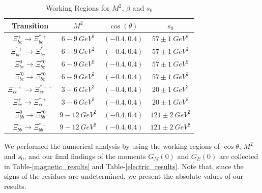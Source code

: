 \begin{table}[ht]
    \centering
    \begin{tabular}{|c|c|c|c|}
        \hline
         Transition & $M^2$ & $\cos(\theta)$ & $s_0$  \\
         \hline
         $\Xi_{bc}^+\rightarrow\Xi_{bc}^{\ast+}$ & $6-9~GeV^2$ & $(-0.4,0.4)$ & $57\pm1 ~GeV^2$\\
         \hline
         $\Xi_{bc}^{\prime+}\rightarrow\Xi_{bc}^{\ast+}$& $6-9~GeV^2$ & $(-0.4,0.4)$ & $57\pm1~ GeV^2$\\
         \hline
         $\Xi_{bc}^0\rightarrow\Xi_{bc}^{\ast0}$& $6-9~GeV^2$ & $(-0.4,0.4)$ & $57\pm1~ GeV^2$\\
         \hline
         $\Xi_{bc}^{\prime0}\rightarrow\Xi_{bc}^{\ast0}$& $6-9 ~GeV^2$ & $(-0.4,0.4)$ & $57\pm1~ GeV^2$\\
         \hline
         $\Xi_{cc}^{++}\rightarrow\Xi_{cc}^{\ast++}$& $3-6 ~GeV^2$ & $(-0.4,0.4)$ & $20\pm1~ GeV^2$\\
         \hline
         $\Xi_{cc}^+\rightarrow\Xi_{cc}^{\ast+}$& $3-6 ~GeV^2$ & $(-0.4,0.4)$ & $20\pm1 ~GeV^2$\\
         \hline
         $\Xi_{bb}^0\rightarrow\Xi_{bb}^{\ast0}$& $9-12 ~GeV^2$ & $(-0.4,0.4)$ & $121\pm2 ~GeV^2$\\
         \hline
         $\Xi_{bb}^-\rightarrow\Xi_{bb}^{\ast-}$& $9-12 ~GeV^2$ & $(-0.4,0.4)$ & $121\pm2 ~GeV^2$\\
        \hline
    \end{tabular}
    \caption{Working Regions for $M^2$, $\beta$ and $s_0$}
    \label{parameter_table}
\end{table}
We performed the numerical analysis by using the working regions of $\cos\theta$, $M^2$ and $s_0$, and our final findings of the moments $G_M(0)$ and $G_E(0)$ are collected in Table-\ref{magnetic_results} and Table-\ref{electric_results}. Note that, since the signs of the residues are undetermined, we present the absolute values of our results.
